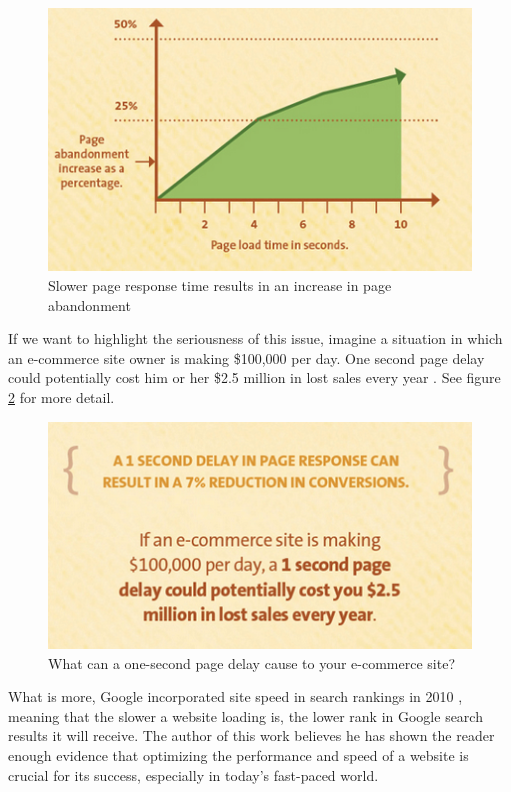 \begin{figure}[H]
\begin{center}
\includegraphics[scale=0.5]{figures/page-abandonment-chart.png}
\caption{Slower page response time results in an increase in page abandonment}
\label{fig:kissmetrics-page-abandonment}
\end{center}
\end{figure}

If we want to highlight the seriousness of this issue, imagine a situation in which an e-commerce site owner is making \$100,000 per day. One second page delay could potentially cost him or her \$2.5 million in lost sales every year \cite{Fig:Kissmetrics-page-abandonment}. See figure \ref{fig:kissmetrics-eshop-delay} for more detail.

\begin{figure}[H]
\begin{center}
\includegraphics[scale=0.5]{figures/kissmetrics-eshop-delay.png}
\caption{What can a one-second page delay cause to your e-commerce site?}
\label{fig:kissmetrics-eshop-delay}
\end{center}
\end{figure}

What is more, Google incorporated site speed in search rankings in 2010 \cite{Study:Google-site-speed-seo}, meaning that the slower a website loading is, the lower rank in Google search results it will receive. The author of this work believes he has shown the reader enough evidence that optimizing the performance and speed of a website is crucial for its success, especially in today's fast-paced world.

